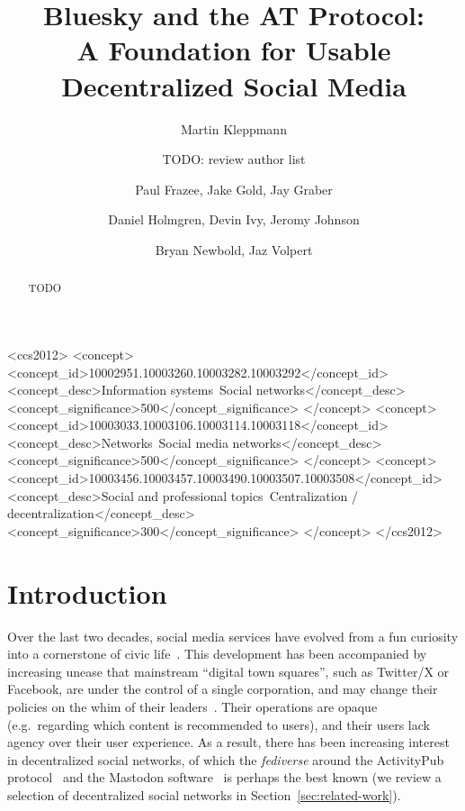 \documentclass[sigconf,review]{acmart}
\begin{document}
\title{Bluesky and the AT Protocol:\\ A Foundation for Usable Decentralized Social Media}
\author{Martin Kleppmann}

\author{TODO: review author list}
\author{Paul Frazee, Jake Gold, Jay Graber}
\author{Daniel Holmgren, Devin Ivy, Jeromy Johnson}
\author{Bryan Newbold, Jaz Volpert}

\begin{abstract}
TODO
\end{abstract}

\begin{CCSXML}
<ccs2012>
   <concept>
       <concept_id>10002951.10003260.10003282.10003292</concept_id>
       <concept_desc>Information systems~Social networks</concept_desc>
       <concept_significance>500</concept_significance>
   </concept>
   <concept>
       <concept_id>10003033.10003106.10003114.10003118</concept_id>
       <concept_desc>Networks~Social media networks</concept_desc>
       <concept_significance>500</concept_significance>
   </concept>
   <concept>
       <concept_id>10003456.10003457.10003490.10003507.10003508</concept_id>
       <concept_desc>Social and professional topics~Centralization / decentralization</concept_desc>
       <concept_significance>300</concept_significance>
   </concept>
 </ccs2012>
\end{CCSXML}


\maketitle

\section{Introduction}

Over the last two decades, social media services have evolved from a fun curiosity into a cornerstone of civic life~\cite{Barabas:2017}.
This development has been accompanied by increasing unease that mainstream ``digital town squares'', such as Twitter/X or Facebook, are under the control of a single corporation, and may change their policies on the whim of their leaders~\cite{Yeung:2023}.
Their operations are opaque (e.g.\ regarding which content is recommended to users), and their users lack agency over their user experience.
As a result, there has been increasing interest in decentralized social networks, of which the \emph{fediverse} around the ActivityPub protocol~\cite{ActivityPub} and the Mastodon software~\cite{Mastodon} is perhaps the best known (we review a selection of decentralized social networks in Section~\ref{sec:related-work}).
\end{document}
